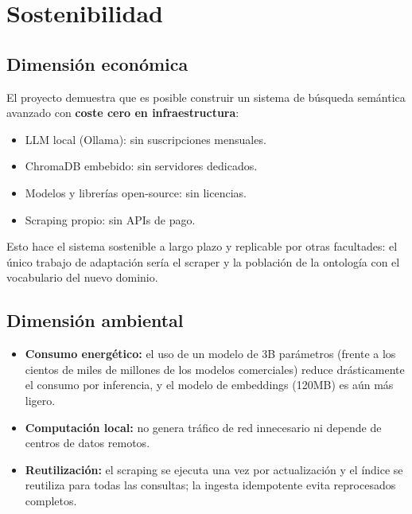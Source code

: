 \documentclass[12pt, a4paper, twoside]{report}
\begin{document}
\chapter{Sostenibilidad}
\label{ch:sostenibilidad}

\section{Dimensi\'on econ\'omica}

El proyecto demuestra que es posible construir un sistema de b\'usqueda sem\'antica avanzado con \textbf{coste cero en infraestructura}:

\begin{itemize}
  \item LLM local (Ollama): sin suscripciones mensuales.
  \item ChromaDB embebido: sin servidores dedicados.
  \item Modelos y librer\'ias open-source: sin licencias.
  \item Scraping propio: sin APIs de pago.
\end{itemize}

Esto hace el sistema sostenible a largo plazo y replicable por otras facultades: el \'unico trabajo de adaptaci\'on ser\'ia el scraper y la poblaci\'on de la ontolog\'ia con el vocabulario del nuevo dominio.

\section{Dimensi\'on ambiental}

\begin{itemize}
  \item \textbf{Consumo energ\'etico:} el uso de un modelo de 3B par\'ametros (frente a los cientos de miles de millones de los modelos comerciales) reduce dr\'asticamente el consumo por inferencia, y el modelo de embeddings (120MB) es a\'un m\'as ligero.
  \item \textbf{Computaci\'on local:} no genera tr\'afico de red innecesario ni depende de centros de datos remotos.
  \item \textbf{Reutilizaci\'on:} el scraping se ejecuta una vez por actualizaci\'on y el \'indice se reutiliza para todas las consultas; la ingesta idempotente evita reprocesados completos.
\end{itemize}
\end{document}
